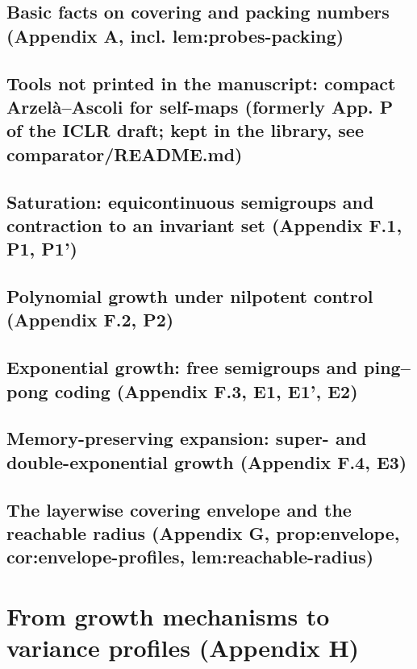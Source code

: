 \section{Basic facts on covering and packing numbers (Appendix A, incl. lem:probes-packing)}

\section{Tools not printed in the manuscript: compact Arzel\`a--Ascoli for self-maps (formerly App. P of the ICLR draft; kept in the library, see comparator/README.md)}

\section{Saturation: equicontinuous semigroups and contraction to an invariant set (Appendix F.1, P1, P1')}

\section{Polynomial growth under nilpotent control (Appendix F.2, P2)}

\section{Exponential growth: free semigroups and ping--pong coding (Appendix F.3, E1, E1', E2)}

\section{Memory-preserving expansion: super- and double-exponential growth (Appendix F.4, E3)}

\section{The layerwise covering envelope and the reachable radius (Appendix G, prop:envelope, cor:envelope-profiles, lem:reachable-radius)}

\chapter{From growth mechanisms to variance profiles (Appendix H)}

